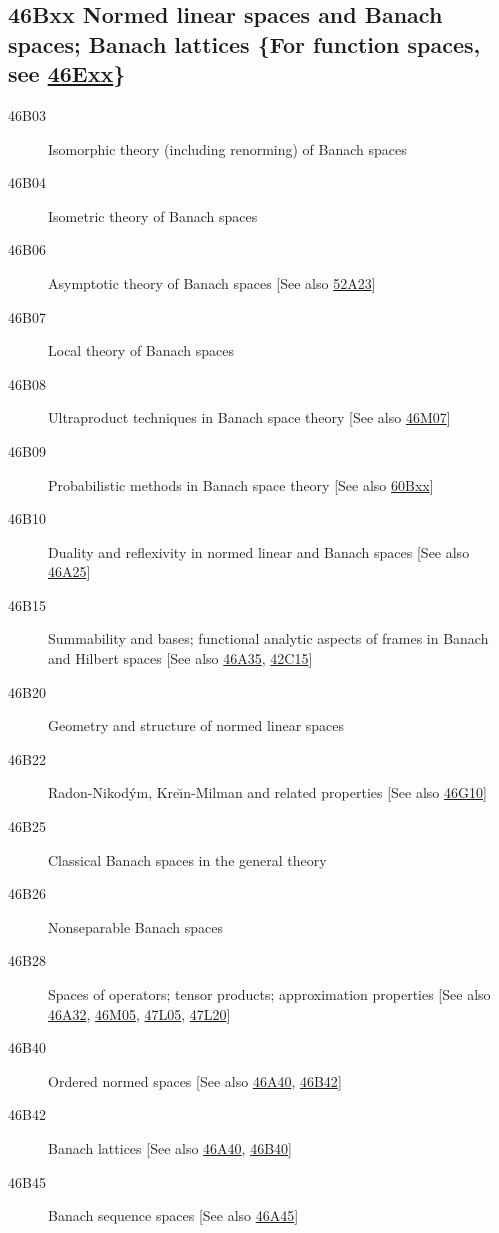 \documentclass[letterpaper]{article}
\begin{document}
\subsection*{46Bxx  Normed linear spaces and Banach spaces; Banach lattices \{For function spaces, see \hyperref[46Exx]{46Exx}\} }\label{46Bxx}
\begin{description}  
\item [46B03]\label{46B03} Isomorphic theory (including renorming) of Banach spaces
\item [46B04]\label{46B04} Isometric theory of Banach spaces
\item [46B06]\label{46B06} Asymptotic theory of Banach spaces [See also \hyperref[52A23]{52A23}]
\item [46B07]\label{46B07} Local theory of Banach spaces
\item [46B08]\label{46B08} Ultraproduct techniques in Banach space theory [See also \hyperref[46M07]{46M07}]
\item [46B09]\label{46B09} Probabilistic methods in Banach space theory [See also \hyperref[60Bxx]{60Bxx}]
\item [46B10]\label{46B10} Duality and reflexivity in normed linear and Banach spaces [See also \hyperref[46A25]{46A25}]
\item [46B15]\label{46B15} Summability and bases; functional analytic aspects of frames in Banach and Hilbert spaces [See also \hyperref[46A35]{46A35}, \hyperref[42C15]{42C15}]
\item [46B20]\label{46B20} Geometry and structure of normed linear spaces
\item [46B22]\label{46B22} Radon-Nikod\'{y}m, Kre\u{\i}n-Milman and related properties [See also \hyperref[46G10]{46G10}]
\item [46B25]\label{46B25} Classical Banach spaces in the general theory
\item [46B26]\label{46B26} Nonseparable Banach spaces
\item [46B28]\label{46B28} Spaces of operators; tensor products; approximation properties [See also \hyperref[46A32]{46A32}, \hyperref[46M05]{46M05}, \hyperref[47L05]{47L05}, \hyperref[47L20]{47L20}]
\item [46B40]\label{46B40} Ordered normed spaces [See also \hyperref[46A40]{46A40}, \hyperref[46B42]{46B42}]
\item [46B42]\label{46B42} Banach lattices [See also \hyperref[46A40]{46A40}, \hyperref[46B40]{46B40}]
\item [46B45]\label{46B45} Banach sequence spaces [See also \hyperref[46A45]{46A45}]

\end{description}
\end{document}
